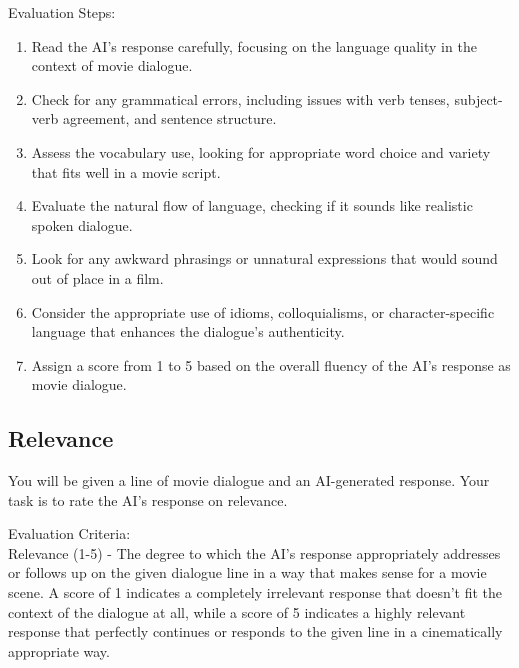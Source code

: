 \documentclass[stu,donotrepeattitle,floatsintext]{apa7}
\begin{document}
\begin{appendices}
        \bigskip
        \noindent Evaluation Steps:
        \begin{enumerate}
            \item Read the AI's response carefully, focusing on the language quality in the context of movie dialogue.
            \item Check for any grammatical errors, including issues with verb tenses, subject-verb agreement, and sentence structure.
            \item Assess the vocabulary use, looking for appropriate word choice and variety that fits well in a movie script.
            \item Evaluate the natural flow of language, checking if it sounds like realistic spoken dialogue.
            \item Look for any awkward phrasings or unnatural expressions that would sound out of place in a film.
            \item Consider the appropriate use of idioms, colloquialisms, or character-specific language that enhances the dialogue's authenticity.
            \item Assign a score from 1 to 5 based on the overall fluency of the AI's response as movie dialogue.
        \end{enumerate}

        \subsection{Relevance}

        \noindent You will be given a line of movie dialogue and an AI-generated response. Your task is to rate the AI's response on relevance.

        \bigskip
        \noindent Evaluation Criteria:\\
        \noindent Relevance (1-5) - The degree to which the AI's response appropriately addresses or follows up on the given dialogue line in a way that makes sense for a movie scene. A score of 1 indicates a completely irrelevant response that doesn't fit the context of the dialogue at all, while a score of 5 indicates a highly relevant response that perfectly continues or responds to the given line in a cinematically appropriate way.


\end{appendices}
\end{document}
